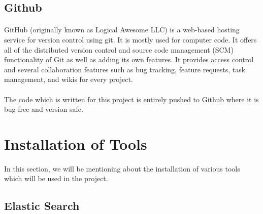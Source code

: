\documentclass{report}
\begin{document}
\subsection{Github}
\paragraph{}
GitHub (originally known as Logical Awesome LLC) is a web-based hosting service for version control using git. It is mostly used for computer code. It offers all of the distributed version control and source code management (SCM) functionality of Git as well as adding its own features. It provides access control and several collaboration features such as bug tracking, feature requests, task management, and wikis for every project.

\paragraph{}
The code which is written for this project is entirely pushed to Github where it is bug free and version safe.

\section{Installation of Tools}
\paragraph{}
In this section, we will be mentioning about the installation of various tools which will be used in the project.

\subsection{Elastic Search}

\end{document}
